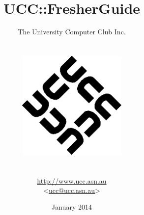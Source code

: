 \begin{titlepage}


\title{UCC::FresherGuide}
\author{The University Computer Club Inc. \\ \\ \\
	\includegraphics[width=0.4\textwidth]{figures/ucc-logo.png} \\  \\ \\ %
	\url{http://www.ucc.asn.au} \\ <\href{mailto:ucc@ucc.asn.au}{ucc@ucc.asn.au}> \\
}

\date{January 2014}



\maketitle
\centering



\end{titlepage}
